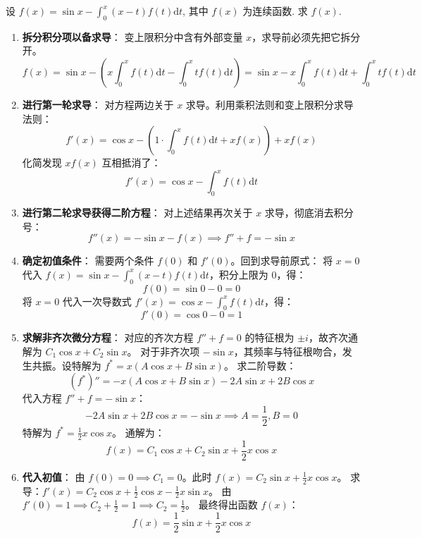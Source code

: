 \documentclass[lang=cn,11pt]{elegantbook}
\begin{document}
\begin{exercise}[含卷积的积分方程求解]
设 $f(x)=\sin x - \int_0^x (x-t)f(t)\mathrm{d}t$, 其中 $f(x)$ 为连续函数. 求 $f(x)$.
\end{exercise}
\begin{solution}
\begin{enumerate}
    \item \textbf{拆分积分项以备求导}：
    变上限积分中含有外部变量 $x$，求导前必须先把它拆分开。
    \[
    f(x) = \sin x - \left( x\int_0^x f(t)\mathrm{d}t - \int_0^x tf(t)\mathrm{d}t \right) = \sin x - x\int_0^x f(t)\mathrm{d}t + \int_0^x tf(t)\mathrm{d}t
    \]
    
    \item \textbf{进行第一轮求导}：
    对方程两边关于 $x$ 求导。利用乘积法则和变上限积分求导法则：
    \[
    f'(x) = \cos x - \left( 1 \cdot \int_0^x f(t)\mathrm{d}t + x f(x) \right) + xf(x)
    \]
    化简发现 $xf(x)$ 互相抵消了：
    \[
    f'(x) = \cos x - \int_0^x f(t)\mathrm{d}t
    \]
    
    \item \textbf{进行第二轮求导获得二阶方程}：
    对上述结果再次关于 $x$ 求导，彻底消去积分号：
    \[
    f''(x) = -\sin x - f(x) \implies f'' + f = -\sin x
    \]
    
    \item \textbf{确定初值条件}：
    需要两个条件 $f(0)$ 和 $f'(0)$。回到求导前原式：
    将 $x=0$ 代入 $f(x) = \sin x - \int_0^x (x-t)f(t)\mathrm{d}t$，积分上限为 0，得：
    \[
    f(0) = \sin 0 - 0 = 0
    \]
    将 $x=0$ 代入一次导数式 $f'(x) = \cos x - \int_0^x f(t)\mathrm{d}t$，得：
    \[
    f'(0) = \cos 0 - 0 = 1
    \]
    
    \item \textbf{求解非齐次微分方程}：
    对应的齐次方程 $f'' + f = 0$ 的特征根为 $\pm i$，故齐次通解为 $C_1\cos x + C_2\sin x$。
    对于非齐次项 $-\sin x$，其频率与特征根吻合，发生共振。设特解为 $f^* = x(A\cos x + B\sin x)$。
    求二阶导数：
    \[
    (f^*)'' = -x(A\cos x + B\sin x) - 2A\sin x + 2B\cos x
    \]
    代入方程 $f'' + f = -\sin x$：
    \[
    -2A\sin x + 2B\cos x = -\sin x \implies A = \frac{1}{2}, B = 0
    \]
    特解为 $f^* = \frac{1}{2}x\cos x$。
    通解为：
    \[
    f(x) = C_1\cos x + C_2\sin x + \frac{1}{2}x\cos x
    \]
    
    \item \textbf{代入初值}：
    由 $f(0) = 0 \implies C_1 = 0$。此时 $f(x) = C_2\sin x + \frac{1}{2}x\cos x$。
    求导：$f'(x) = C_2\cos x + \frac{1}{2}\cos x - \frac{1}{2}x\sin x$。
    由 $f'(0) = 1 \implies C_2 + \frac{1}{2} = 1 \implies C_2 = \frac{1}{2}$。
    最终得出函数 $f(x)$：
    \[
    \boxed{f(x) = \frac{1}{2}\sin x + \frac{1}{2}x\cos x}
    \]
\end{enumerate}
\end{solution}
\end{document}
